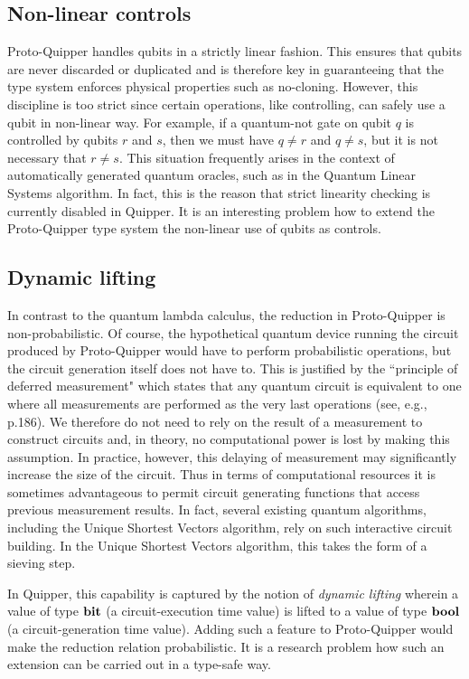 \documentclass[twoside]{article}
\begin{document}
\subsection{Non-linear controls}

Proto-Quipper handles qubits in a strictly linear fashion. This
ensures that qubits are never discarded or duplicated and is therefore
key in guaranteeing that the type system enforces physical properties
such as no-cloning. However, this discipline is too strict since
certain operations, like controlling, can safely use a qubit in
non-linear way. For example, if a quantum-not gate on qubit $q$ is
controlled by qubits $r$ and $s$, then we must have $q\neq r$ and
$q\neq s$, but it is not necessary that $r\neq s$. This situation
frequently arises in the context of automatically generated quantum
oracles, such as in the Quantum Linear Systems algorithm. In fact,
this is the reason that strict linearity checking is currently
disabled in Quipper. It is an interesting problem how to extend the
Proto-Quipper type system the non-linear use of qubits as controls.

\subsection{Dynamic lifting}

In contrast to the quantum lambda calculus, the reduction in
Proto-Quipper is non-probabilistic. Of course, the hypothetical
quantum device running the circuit produced by Proto-Quipper would
have to perform probabilistic operations, but the circuit generation
itself does not have to. This is justified by the ``principle of
deferred measurement" which states that any quantum circuit is
equivalent to one where all measurements are performed as the very
last operations (see, e.g., \cite{NC02} p.186). We therefore do not
need to rely on the result of a measurement to construct circuits and,
in theory, no computational power is lost by making this
assumption. In practice, however, this delaying of measurement may
significantly increase the size of the circuit. Thus in terms of
computational resources it is sometimes advantageous to permit circuit
generating functions that access previous measurement results. In
fact, several existing quantum algorithms, including the Unique
Shortest Vectors algorithm, rely on such interactive circuit
building. In the Unique Shortest Vectors algorithm, this takes the
form of a sieving step. 

In Quipper, this capability is captured by the notion of \emph{dynamic
  lifting} wherein a value of type $\textrm{\bf bit}$ (a circuit-execution time
value) is lifted to a value of type $\textrm{\bf bool}$ (a circuit-generation time
value). Adding such a feature to Proto-Quipper would make the
reduction relation probabilistic. It is a research problem how such an
extension can be carried out in a type-safe way. 
\end{document}
